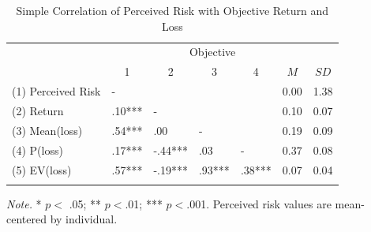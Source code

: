 \documentclass[a4paper,man, natbib,floatsintext]{apa6} %
\begin{document}
\begin{table}[tbp]
\begin{center}                     
\begin{threeparttable}                         
\caption{Simple Correlation of Perceived Risk with Objective Return and Loss}
\label{tab:cor_risk_loss}

                                                                                     
\begin{tabular}{lllllll}
\toprule                                                                             
 & & \multicolumn{3}{c}{Objective}  &\\                                                
\cmidrule(r){3-5}                                                                    
 & \multicolumn{1}{c}{1} & \multicolumn{1}{c}{2} & \multicolumn{1}{c}{3} & \multicolumn{1}{c}{4} & \multicolumn{1}{c}{$M$} & \multicolumn{1}{c}{$SD$}\\                   
\midrule                                                                             
(1) Perceived Risk & - &  &  &  & 0.00 & 1.38\\                                      
(2) Return & .10*** & - &  &  & 0.10 & 0.07\\                                        
(3) Mean(loss) & .54*** & .00 & - &  & 0.19 & 0.09\\                                 
(4) P(loss) & .17*** & -.44*** & .03 & - & 0.37 & 0.08\\                             
(5) EV(loss) & .57*** & -.19*** & .93*** & .38*** & 0.07 & 0.04\\             
\bottomrule                                                                          
\addlinespace                                                                        
\end{tabular}                                                                        
                                                                                     
\begin{tablenotes}[para]                                                             
\normalsize{\textit{Note.} * $p <$ .05; ** $p < $.01; *** $p < $.001. Perceived risk values are mean-centered by individual.}                                                                          
\end{tablenotes}                                                                     
                                                                                     
\end{threeparttable}                                                                 
\end{center}                                                                         
                                                                                     
\end{table}
\end{document}
